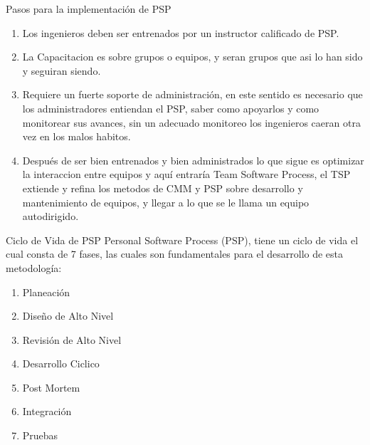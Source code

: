 \documentclass[]{beamer}
\begin{document}
			\begin{frame}{Pasos para la implementación de PSP}
				\begin{enumerate}
					\item Los ingenieros deben ser entrenados por un instructor calificado de PSP. \\ \smallskip \pause
					\item La Capacitacion es sobre grupos o equipos, y seran grupos que asi lo han sido y seguiran siendo. \\ \smallskip \pause
					\item Requiere un fuerte soporte de administración, en este sentido es necesario que los administradores entiendan el PSP, saber como apoyarlos y como monitorear sus avances, sin un adecuado monitoreo los ingenieros caeran otra vez en los malos habitos. \\ \smallskip \pause
					\item Después de ser bien entrenados y bien administrados lo que sigue es optimizar la interaccion entre equipos y aquí entraría Team Software Process, el TSP extiende y refina los metodos de CMM y PSP sobre desarrollo y mantenimiento de equipos, y llegar a lo que se le llama un equipo autodirigido. \\ \smallskip
				\end{enumerate}
			\end{frame}		
			
			\begin{frame}{Ciclo de Vida de PSP}
				Personal Software Process (PSP), tiene un ciclo de vida el cual consta de 7 fases, las cuales son fundamentales para el desarrollo de esta metodología: \\ \pause
				\begin{enumerate}
					\item Planeación \pause
					\item Diseño de Alto Nivel \pause
					\item Revisión de Alto Nivel \pause
					\item Desarrollo Ciclico \pause
					\item Post Mortem \pause
					\item Integración \pause
					\item Pruebas
				\end{enumerate}
			\end{frame}								
				
\end{document}
